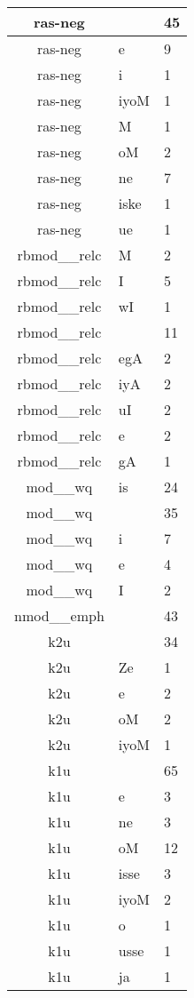 \documentclass[a4 paper]{article}
\begin{document}
\begin{longtable}{cp{}p{}}
ras-neg &  & 45\\ \midrule ras-neg & e & 9\\ \midrule ras-neg & i & 1\\ \midrule ras-neg & iyoM & 1\\ \midrule ras-neg & M & 1\\ \midrule ras-neg & oM & 2\\ \midrule ras-neg & ne & 7\\ \midrule ras-neg & iske & 1\\ \midrule ras-neg & ue & 1\\ \midrule 
rbmod\_\_relc & M & 2\\ \midrule rbmod\_\_relc & I & 5\\ \midrule rbmod\_\_relc & wI & 1\\ \midrule rbmod\_\_relc &  & 11\\ \midrule rbmod\_\_relc & egA & 2\\ \midrule rbmod\_\_relc & iyA & 2\\ \midrule rbmod\_\_relc & uI & 2\\ \midrule rbmod\_\_relc & e & 2\\ \midrule rbmod\_\_relc & gA & 1\\ \midrule 
mod\_\_wq & is & 24\\ \midrule mod\_\_wq &  & 35\\ \midrule mod\_\_wq & i & 7\\ \midrule mod\_\_wq & e & 4\\ \midrule mod\_\_wq & I & 2\\ \midrule 
nmod\_\_emph &  & 43\\ \midrule 
k2u &  & 34\\ \midrule k2u & Ze & 1\\ \midrule k2u & e & 2\\ \midrule k2u & oM & 2\\ \midrule k2u & iyoM & 1\\ \midrule 
k1u &  & 65\\ \midrule k1u & e & 3\\ \midrule k1u & ne & 3\\ \midrule k1u & oM & 12\\ \midrule k1u & isse & 3\\ \midrule k1u & iyoM & 2\\ \midrule k1u & o & 1\\ \midrule k1u & usse & 1\\ \midrule k1u & ja & 1\\ \midrule 

\end{longtable}
\end{document}
